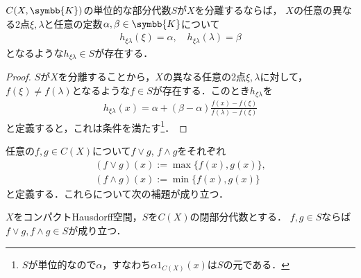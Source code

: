 \documentclass[../main.tex]{subfiles}
\begin{document}
\begin{thmbox}
\begin{lemma}
\(C(X, \symbb{K})\)の単位的な部分代数\(S\)が\(X\)を分離するならば，
\(X\)の任意の異なる2点\(\xi, \lambda\)と任意の定数\(\alpha, \beta \in \symbb{K}\)について
\begin{align*}
    h_{\xi\lambda}(\xi) = \alpha,\quad h_{\xi\lambda}(\lambda) = \beta
\end{align*}
となるような\(h_{\xi\lambda} \in S\)が存在する．
\end{lemma}
\end{thmbox}

\begin{proof}
\(S\)が\(X\)を分離することから，\(X\)の異なる任意の2点\(\xi, \lambda\)に対して，\(f(\xi) \neq f(\lambda)\)となるような\(f \in S\)が存在する．このとき\(h_{\xi\lambda}\)を
\begin{align*}
    h_{\xi\lambda}(x) = \alpha + (\beta - \alpha) \frac{f(x) - f(\xi)}{f(\lambda) - f(\xi)}
\end{align*}
と定義すると，これは条件を満たす\footnote{%
\(S\)が単位的なので\(\alpha\)，すなわち\(\alpha 1_{C(X)}(x)\)は\(S\)の元である．
}．
\end{proof}

任意の\(f, g \in C(X)\)について\(f \lor g\), \(f \land g\)をそれぞれ
\begin{gather*}
    (f \lor g)(x) := \max \{ f(x), g(x) \}, \\
    (f \land g)(x) := \min \{ f(x), g(x) \}
\end{gather*}
と定義する．これらについて次の補題が成り立つ．

\begin{thmbox}
\begin{lemma}
\(X\)をコンパクトHausdorff空間，\(S\)を\(C(X)\)の閉部分代数とする．
\(f, g \in S\)ならば\(f \lor g, f\land g \in S\)が成り立つ．
\end{lemma}
\end{thmbox}
\end{document}
